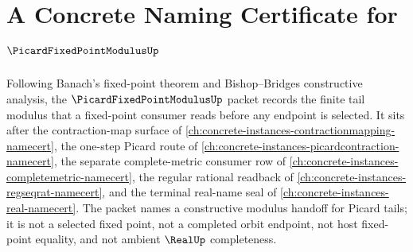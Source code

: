 \chapter{A Concrete Naming Certificate for $\PicardFixedPointModulusUp$}
\label{ch:concrete-instances-picard-fixed-point-modulus-namecert}

Following Banach's fixed-point theorem and Bishop--Bridges constructive analysis, the $\PicardFixedPointModulusUp$ packet records the finite tail modulus that a fixed-point consumer reads before any endpoint is selected. It sits after the contraction-map surface of \autoref{ch:concrete-instances-contractionmapping-namecert}, the one-step Picard route of \autoref{ch:concrete-instances-picardcontraction-namecert}, the separate complete-metric consumer row of \autoref{ch:concrete-instances-completemetric-namecert}, the regular rational readback of \autoref{ch:concrete-instances-regseqrat-namecert}, and the terminal real-name seal of \autoref{ch:concrete-instances-real-namecert}. The packet names a constructive modulus handoff for Picard tails; it is not a selected fixed point, not a completed orbit endpoint, not host fixed-point equality, and not ambient $\RealUp$ completeness.

